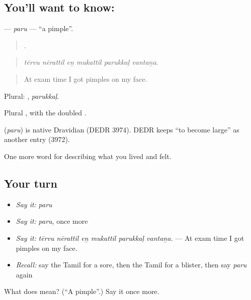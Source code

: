 \subsection*{You'll want to know: }
\textbf{} — \emph{paru} — \textquotedblleft{}a pimple\textquotedblright{}.

\begin{quote}
     .
\end{quote}

\begin{quote}
\emph{tērvu nērattil eṉ mukattil parukkaḷ vantaṉa.}
\end{quote}

\begin{quote}
At exam time I got pimples on my face.
\end{quote}

Plural: , \emph{parukkaḷ}.

Plural , with the doubled .

\begin{cousinweb}
\textbf{} (\emph{paru}) is native Dravidian (DEDR 3974). DEDR keeps  \textquotedblleft{}to become large\textquotedblright{} as another entry (3972).
\end{cousinweb}

\begin{grammarlens}[title={What you've built}]
One more word for describing what you lived and felt.
\end{grammarlens}

\subsection*{Your turn}
\begin{itemize}
\raggedright
  \item \emph{Say it:} \emph{paru}
  \item \emph{Say it:} \emph{paru}, once more
  \item \emph{Say it:} \emph{tērvu nērattil eṉ mukattil parukkaḷ vantaṉa.} — At exam time I got pimples on my face.
  \item \emph{Recall:} say the Tamil for a sore, then the Tamil for a blister, then say \emph{paru} again
\end{itemize}

\begin{tcolorbox}[breakable,colback=teal!4,colframe=teal!35!black,title={Before you move on}]
What does  mean? (\textquotedblleft{}A pimple\textquotedblright{}.) Say it once more.
\end{tcolorbox}
